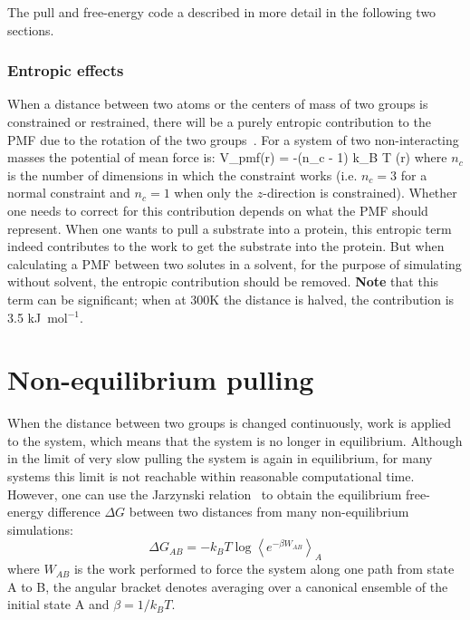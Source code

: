 The pull and free-energy code a described in more detail
in the following two sections.

\subsubsection{Entropic effects}
When a distance between two atoms or the centers of mass of two groups
is constrained or restrained, there will be a purely entropic contribution
to the PMF due to the rotation of the two groups~\cite{RMNeumann1980a}.
For a system of two non-interacting masses the potential of mean force is:
\beq
V_{pmf}(r) = -(n_c - 1) k_B T \log(r)
\eeq
where $n_c$ is the number of dimensions in which the constraint works
(i.e. $n_c=3$ for a normal constraint and $n_c=1$ when only
the $z$-direction is constrained).
Whether one needs to correct for this contribution depends on what
the PMF should represent. When one wants to pull a substrate
into a protein, this entropic term indeed contributes to the work to
get the substrate into the protein. But when calculating a PMF
between two solutes in a solvent, for the purpose of simulating
without solvent, the entropic contribution should be removed.
{\bf Note} that this term can be significant; when at 300K the distance is halved,
the contribution is 3.5 kJ~mol$^{-1}$.

\section{Non-equilibrium pulling}
When the distance between two groups is changed continuously,
work is applied to the system, which means that the system is no longer
in equilibrium. Although in the limit of very slow pulling
the system is again in equilibrium, for many systems this limit
is not reachable within reasonable computational time.
However, one can use the Jarzynski relation~\cite{Jarzynski1997a}
to obtain the equilibrium free-energy difference $\Delta G$
between two distances from many non-equilibrium simulations:
\begin{equation}
   \Delta G_{AB} = -k_BT \log \left\langle e^{-\beta W_{AB}} \right\rangle_A
   \label{eq:Jarz}
\end{equation}
where $W_{AB}$ is the work performed to force the system along one path
from state A to B, the angular bracket denotes averaging over
a canonical ensemble of the initial state A and $\beta=1/k_B T$.


